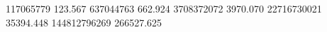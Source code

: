 117065779    123.567
637044763    662.924
3708372072   3970.070
22716730021  35394.448
144812796269 266527.625
